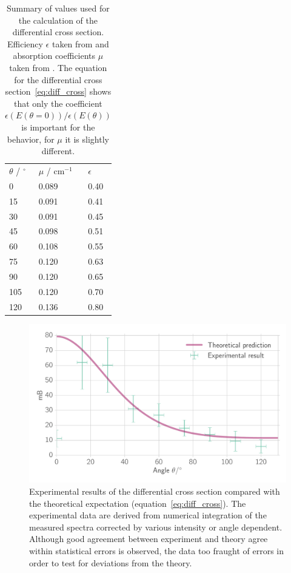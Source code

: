 \begin{table}

\caption{Summary of values used for the calculation of the differential cross
  section. Efficiency $\epsilon$ taken from \cite{fluegge} and absorption coefficients $\mu$
  taken from \cite{ver}. The equation for the differential cross section~\eqref{eq:diff_cross} shows that only the 
  coefficient $\epsilon(E(\theta = 0) ) / \epsilon(E(\theta))$ is important for the behavior, for $\mu$ it is slightly
different. }
  \begin{tabular}{lll}
      \rowcolor{LightCyan}  $\theta$ / $^\circ$ & $\mu$ / $\mathrm{cm}^{-1}$ & $\epsilon$ \\ 
      \cellcolor{LightCyan}  0 &    0.089 & 0.40 \\ 
 \cellcolor{LightCyan}  15 &   0.091 & 0.41  \\
 \cellcolor{LightCyan}  30 &   0.091 & 0.45  \\
 \cellcolor{LightCyan}  45 &   0.098 & 0.51  \\
 \cellcolor{LightCyan}  60 &   0.108 & 0.55  \\
 \cellcolor{LightCyan}  75 &   0.120 & 0.63  \\
 \cellcolor{LightCyan}  90 &   0.120 & 0.65  \\
 \cellcolor{LightCyan}  105 &  0.120 & 0.70  \\
 \cellcolor{LightCyan}  120 &  0.136 & 0.80  
  \end{tabular}
    \label{tab:cross}
\end{table}


\begin{figure}[htpb]
    \centering
    \includegraphics[width=0.9\linewidth]{./analysis/figures/na_cross_section}
    \caption{Experimental results of the differential cross section compared with the theoretical expectation 
        (equation~\eqref{eq:diff_cross}). The experimental data are derived from numerical integration of the measured spectra corrected
        by various intensity or angle dependent. Although good agreement between experiment and theory agree within statistical errors is
        observed, the data too fraught of errors in order to test for deviations from the theory.}
\label{fig:na_cross_section}
\end{figure}
\newpage
